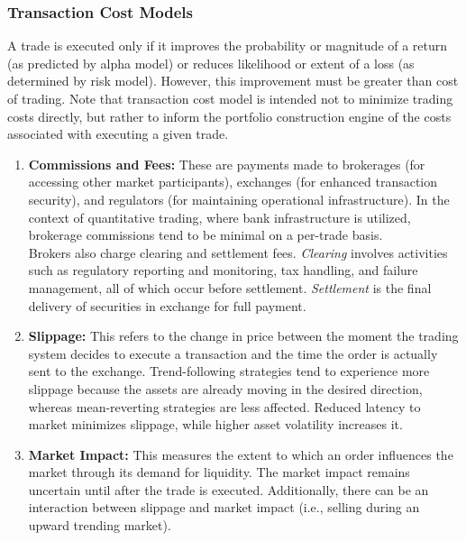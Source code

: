 \subsubsection{Transaction Cost Models}

A trade is executed only if it improves the probability or magnitude of a return (as predicted by alpha model) or reduces likelihood or extent of a loss (as determined by risk model). However, this improvement must be greater than cost of trading. Note that transaction cost model is intended not to minimize trading costs directly, but rather to inform the portfolio construction engine of the costs associated with executing a given trade.

\begin{remark} 
\begin{enumerate}[label=\roman*.]
\setlength{\itemsep}{0pt}
    \item \textbf{Commissions and Fees:} These are payments made to brokerages (for accessing other market participants), exchanges (for enhanced transaction security), and regulators (for maintaining operational infrastructure). In the context of quantitative trading, where bank infrastructure is utilized, brokerage commissions tend to be minimal on a per-trade basis.\\[1mm]
    Brokers also charge clearing and settlement fees. \emph{Clearing} involves activities such as regulatory reporting and monitoring, tax handling, and failure management, all of which occur before settlement. \emph{Settlement} is the final delivery of securities in exchange for full payment.
    \item \textbf{Slippage:} This refers to the change in price between the moment the trading system decides to execute a transaction and the time the order is actually sent to the exchange. Trend-following strategies tend to experience more slippage because the assets are already moving in the desired direction, whereas mean-reverting strategies are less affected. Reduced latency to market minimizes slippage, while higher asset volatility increases it.  
    \item \textbf{Market Impact:} This measures the extent to which an order influences the market through its demand for liquidity. The market impact remains uncertain until after the trade is executed. Additionally, there can be an interaction between slippage and market impact (i.e., selling during an upward trending market).
\end{enumerate}
\end{remark}

